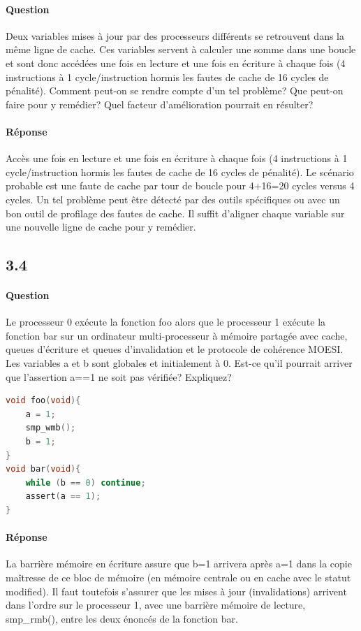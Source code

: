 \documentclass[oneside]{book}
\begin{document}
\paragraph{Question}
Deux variables mises à jour par des processeurs différents se retrouvent dans la
même ligne de cache. Ces variables servent à calculer une somme dans une
boucle et sont donc accédées une fois en lecture et une fois en écriture à chaque
fois (4 instructions à 1 cycle/instruction hormis les fautes de cache de 16 cycles de
pénalité). Comment peut-on se rendre compte d'un tel problème? Que peut-on
faire pour y remédier? Quel facteur d'amélioration pourrait en résulter?
\paragraph{Réponse}
Accès une fois en lecture et une fois en écriture à chaque fois (4 instructions à 1
cycle/instruction hormis les fautes de cache de 16 cycles de pénalité). Le
scénario probable est une faute de cache par tour de boucle pour 4+16=20
cycles versus 4 cycles. Un tel problème peut être détecté par des outils
spécifiques ou avec un bon outil de profilage des fautes de cache. Il suffit
d'aligner chaque variable sur une nouvelle ligne de cache pour y remédier.
\subsection{3.4}
\paragraph{Question}
Le processeur 0 exécute la fonction foo alors que le processeur 1 exécute la
fonction bar sur un ordinateur multi-processeur à mémoire partagée avec cache,
queues d'écriture et queues d'invalidation et le protocole de cohérence MOESI.
Les variables a et b sont globales et initialement à 0. Est-ce qu'il pourrait arriver
que l'assertion a==1 ne soit pas vérifiée? Expliquez?
\begin{lstlisting}[language=c]
void foo(void){ 
	a = 1;
	smp_wmb();
	b = 1;
}
void bar(void){ 
	while (b == 0) continue;
	assert(a == 1);
}

\end{lstlisting}
\paragraph{Réponse}
La barrière mémoire en écriture assure que b=1 arrivera après a=1 dans la copie
maîtresse de ce bloc de mémoire (en mémoire centrale ou en cache avec le
statut modified). Il faut toutefois s'assurer que les mises à jour (invalidations)
arrivent dans l'ordre sur le processeur 1, avec une barrière mémoire de lecture,
smp\_rmb(), entre les deux énoncés de la fonction bar.
\end{document}
